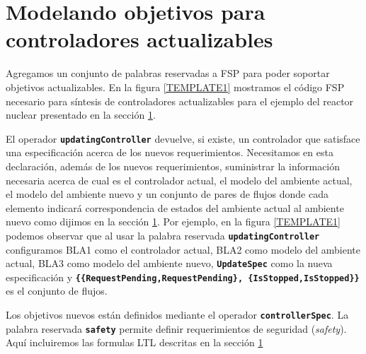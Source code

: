 \section{Modelando objetivos para controladores actualizables}

Agregamos un conjunto de palabras reservadas a FSP para poder soportar objetivos actualizables. En la figura
\ref{TEMPLATE1} mostramos el código FSP necesario para síntesis de controladores actualizables para el ejemplo del reactor nuclear
presentado en la sección \ref{}.

El operador \texttt{\textbf{updatingController}} devuelve, si existe, un controlador que satisface una especificación
acerca de los nuevos requerimientos. Necesitamos en esta declaración, además de los nuevos requerimientos, suministrar
la información necesaria acerca de cual es el controlador actual, el modelo del ambiente actual, el modelo del ambiente
nuevo y un conjunto de pares de flujos donde cada elemento indicará correspondencia de estados del ambiente actual al
ambiente nuevo como dijimos en la sección \ref{}. Por ejemplo, en la figura \ref{TEMPLATE1} podemos observar que
al usar la palabra reservada \texttt{\textbf{updatingController}} configuramos BLA1 como el controlador actual, BLA2
como modelo del ambiente actual, BLA3 como modelo del ambiente nuevo, \texttt{\textbf{UpdateSpec}} como la nueva
especificación y \texttt{\textbf{\{\{RequestPending,RequestPending\}, \{IsStopped,IsStopped\}\}}} es el conjunto de
flujos.

Los objetivos nuevos están definidos mediante el operador \texttt{\textbf{controllerSpec}}. La palabra reservada
\texttt{\textbf{safety}} permite definir requerimientos de seguridad (\emph{safety}). Aquí incluiremos las formulas
LTL descritas en la sección \ref{}

